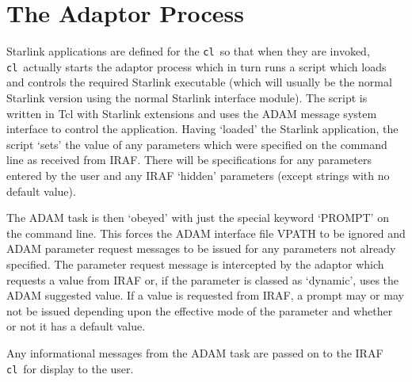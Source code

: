 \documentclass[twoside,11pt]{article}
\newcommand{\htmlref}[2]{#1}
\newcommand{\xref}[3]{#1}
\newcommand{\xlabel}[1]{}
\newcommand{\cl}{\texttt{cl}}
\begin{document}
\section{\xlabel{the_adaptor_process}The Adaptor Process}
Starlink applications are defined for the \cl\ so that when they are invoked,
\cl\ actually starts the adaptor process which in turn runs a script which
loads and controls the required Starlink executable (which will usually be the
normal Starlink version using the normal Starlink interface module).
The script is written in
\xref{Tcl with Starlink extensions}{sun186}{}
and uses the ADAM message system interface to control the application.
Having `loaded' the Starlink application, the script `sets' the value of
any parameters which were specified on the command line as received from IRAF.
There will be specifications for any parameters entered by the user and any
IRAF `hidden' parameters (except strings with no default value).

The ADAM task is then `obeyed' with just the special keyword `PROMPT' on the
command line.
This forces the ADAM interface file VPATH to be ignored and ADAM parameter
request messages to be issued for any parameters not already specified.
The parameter request message is intercepted by the adaptor which requests
a value from IRAF or, if the parameter is classed as
\htmlref{`dynamic'}{dynamic_parameters},
uses the ADAM
suggested value. 
If a value is requested from IRAF, a prompt may or may not be issued depending
upon the effective mode of the parameter and whether or not it has a default
value.

Any informational messages from the ADAM task are passed on to the IRAF
\cl\ for display to the user.
\end{document}
